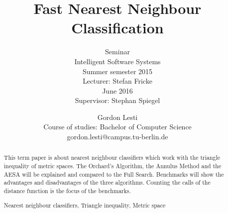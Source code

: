 \documentclass[runningheads,a4paper]{llncs}
\newcommand{\keywords}[1]{\par\addvspace\baselineskip
\noindent\keywordname\enspace\ignorespaces#1}
\begin{document}
\setlength{\tabcolsep}{12pt}

\mainmatter

\title{Fast Nearest Neighbour Classification}
\subtitle{\textnormal{\small{Seminar\\
Intelligent Software Systems\\
Summer semester 2015\\\vspace{1\baselineskip}
Lecturer: Stefan Fricke\\\vspace{2\baselineskip}
June 2016\\
Supervisor: Stephan Spiegel\\\vspace{1\baselineskip}}}}


\author{Gordon Lesti\\Course of studies: Bachelor of Computer Science\\gordon.lesti@campus.tu-berlin.de\\\vspace{5\baselineskip}}



\maketitle

\begin{abstract}
This term paper is about nearest neighbour classifiers which work with the triangle inequality of metric spaces. The
Orchard’s Algorithm, the Annulus Method and the AESA will be explained and compared to the Full Search.
Benchmarks will show the advantages and disadvantages of the three algorithms. Counting the calls of the distance
function is the focus of the benchmarks.
\keywords{Nearest neighbour classifiers, Triangle inequality, Metric space}
\end{abstract}
\end{document}
